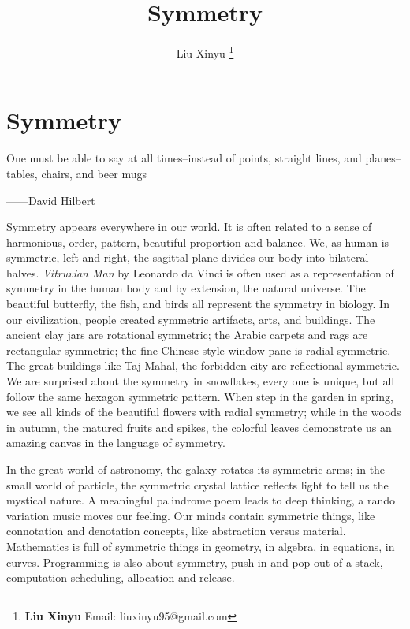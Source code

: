 \documentclass[b5paper]{article}
\begin{document}
\title{Symmetry}

\author{Liu Xinyu
\thanks{{\bfseries Liu Xinyu} \newline
  Email: liuxinyu95@gmail.com \newline}}

\maketitle
\fi


\ifx\wholebook\relax
\chapter{Symmetry}
\fi

\epigraph{One must be able to say at all times--instead of points, straight lines, and planes--tables, chairs, and beer mugs}{——David Hilbert}

Symmetry appears everywhere in our world. It is often related to a sense of harmonious, order, pattern, beautiful proportion and balance. We, as human is symmetric, left and right, the sagittal plane divides our body into bilateral halves. {\em Vitruvian Man} by Leonardo da Vinci is often used as a representation of symmetry in the human body and by extension, the natural universe. The beautiful butterfly, the fish, and birds all represent the symmetry in biology. In our civilization, people created symmetric artifacts, arts, and buildings. The ancient clay jars are rotational symmetric; the Arabic carpets and rags are rectangular symmetric; the fine Chinese style window pane is radial symmetric. The great buildings like Taj Mahal, the forbidden city are reflectional symmetric. We are surprised about the symmetry in snowflakes, every one is unique, but all follow the same hexagon symmetric pattern. When step in the garden in spring, we see all kinds of the beautiful flowers with radial symmetry; while in the woods in autumn, the matured fruits and spikes, the colorful leaves demonstrate us an amazing canvas in the language of symmetry.

In the great world of astronomy, the galaxy rotates its symmetric arms; in the small world of particle, the symmetric crystal lattice reflects light to tell us the mystical nature. A meaningful palindrome poem leads to deep thinking, a rando variation music moves our feeling. Our minds contain symmetric things, like connotation and denotation concepts, like abstraction versus material. Mathematics is full of symmetric things in geometry, in algebra, in equations, in curves. Programming is also about symmetry, push in and pop out of a stack, computation scheduling, allocation and release.
\end{document}
